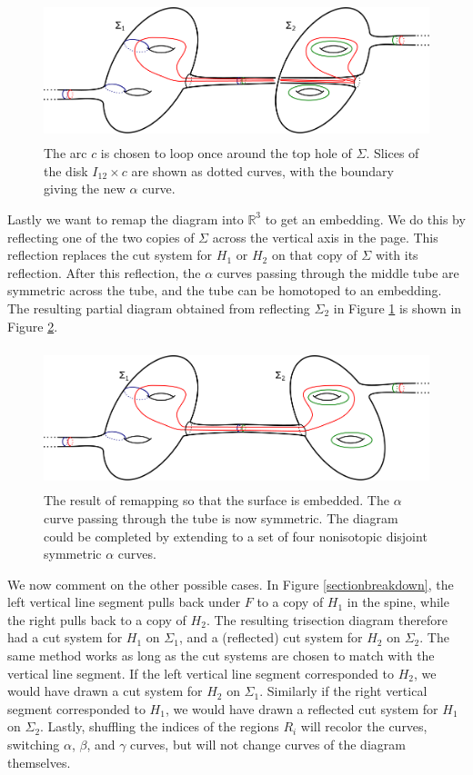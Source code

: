 \documentclass[12pt]{amsart}
\newcommand{\R}{\mathbb{R}}
\theoremstyle{definition}
\theoremstyle{remark}
\begin{document}
\begin{figure}[h]
\centering
\includegraphics[height=1.6in]{coresubsurfacediagram.png}
\caption{The arc $c$ is chosen to loop once around the top hole of $\Sigma$.
Slices of the disk $I_{12} \times c$ are shown as dotted curves, with the boundary giving the new $\alpha$ curve.}
\label{fig_coresubsurfacediagram}
\end{figure}

Lastly we want to remap the diagram into $\R^3$ to get an embedding.
We do this by reflecting one of the two copies of $\Sigma$ across the vertical axis in the page.
This reflection replaces the cut system for $H_1$ or $H_2$ on that copy of $\Sigma$ with its reflection.
After this reflection, the $\alpha$ curves passing through the middle tube are symmetric across the tube, and the tube can be homotoped to an embedding.
The resulting partial diagram obtained from reflecting $\Sigma_2$ in Figure \ref{fig_coresubsurfacediagram} is shown in Figure \ref{fig_coresubsurfacediagram_embedded}.

\begin{figure}[h]
\centering
\includegraphics[height=1.6in]{coresubsurfacediagram_embedded.png}
\caption{The result of remapping so that the surface is embedded.
The $\alpha$ curve passing through the tube is now symmetric.
The diagram could be completed by extending to a set of four nonisotopic disjoint symmetric $\alpha$ curves.}
\label{fig_coresubsurfacediagram_embedded}
\end{figure}

We now comment on the other possible cases.
In Figure \ref{sectionbreakdown}, the left vertical line segment pulls back under $F$ to a copy of $H_1$ in the spine, while the right pulls back to a copy of $H_2$.
The resulting trisection diagram therefore had a cut system for $H_1$ on $\Sigma_1$, and a (reflected) cut system for $H_2$ on $\Sigma_2$.
The same method works as long as the cut systems are chosen to match with the vertical line segment.
If the left vertical line segment corresponded to $H_2$, we would have drawn a cut system for $H_2$ on $\Sigma_1$.
Similarly if the right vertical segment corresponded to $H_1$, we would have drawn a reflected cut system for $H_1$ on $\Sigma_2$.
Lastly, shuffling the indices of the regions $R_i$ will recolor the curves, switching $\alpha$, $\beta$, and $\gamma$ curves, but will not change curves of the diagram themselves.
\end{document}
